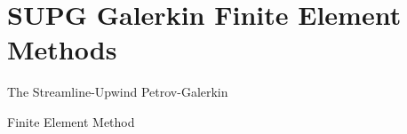 \documentclass[compress,11pt]{beamer}
\begin{document}


\section[SUPG FEM]{SUPG Galerkin Finite Element Methods}
\frame
{
  \vspace{4em}
  \centerline{\huge{The Streamline-Upwind Petrov-Galerkin}}
  \vspace{.5em}

  \centerline{\huge{Finite Element Method}}
}
\end{document}
